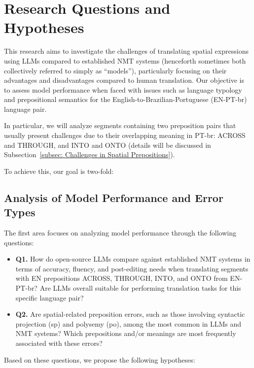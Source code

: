 \section{Research Questions and Hypotheses}

This research aims to investigate the challenges of translating spatial expressions using LLMs compared to established NMT systems (henceforth sometimes both collectively referred to simply as ``models''), particularly focusing on their advantages and disadvantages compared to human translation. Our objective is to assess model performance when faced with issues such as language typology and prepositional semantics for the English-to-Brazilian-Portuguese (EN-PT-br) language pair.

In particular, we will analyze segments containing two preposition pairs that usually present challenges due to their overlapping meaning in PT-br: ACROSS and THROUGH, and INTO and ONTO (details will be discussed in Subsection~\ref{subsec: Challenges in Spatial Prepositions}).

To achieve this, our goal is two-fold:

\subsection{Analysis of Model Performance and Error Types}
\label{sub:q1-q2}

The first area focuses on analyzing model performance through the following questions:

\begin{itemize}
\item \textbf{Q1.} How do open-source LLMs compare against established NMT systems in terms of accuracy, fluency, and post-editing needs when translating segments with EN prepositions ACROSS, THROUGH, INTO, and ONTO from EN-PT-br? Are LLMs overall suitable for performing translation tasks for this specific language pair? 

\item \textbf{Q2.} Are spatial-related preposition errors, such as those involving syntactic projection (sp) and polysemy (po), among the most common in LLMs and NMT systems? Which prepositions and/or meanings are most frequently associated with these errors?
\end{itemize} 

Based on these questions, we propose the following hypotheses:


